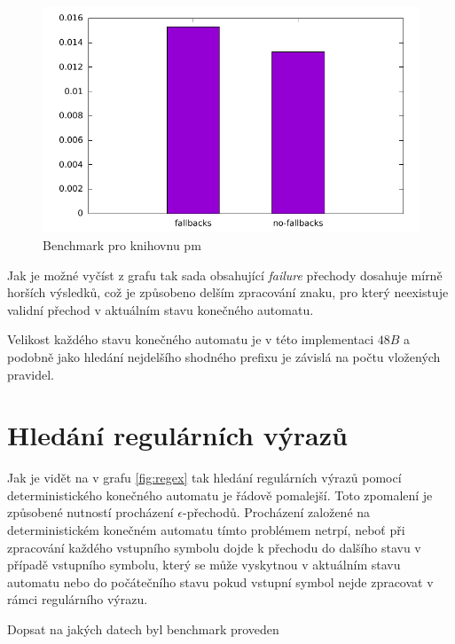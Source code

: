 \begin{figure}[!htbp]
	\centering
	\includegraphics[scale=0.7]{fig/pm.pdf}
	\caption{Benchmark pro knihovnu pm}
    \label{fig:pm}
\end{figure}

Jak je možné vyčíst z grafu tak sada obsahující \textit{failure} přechody dosahuje mírně horších výsledků,
což je způsobeno delším zpracování znaku, pro který neexistuje validní přechod v aktuálním stavu konečného automatu.

Velikost každého stavu konečného automatu je v této implementaci $48B$
a podobně jako hledání nejdelšího shodného prefixu je závislá na počtu vložených pravidel.

\section{Hledání regulárních výrazů} %

Jak je vidět na v grafu \ref{fig:regex} tak hledání regulárních výrazů pomocí deterministického
konečného automatu je řádově pomalejší. Toto zpomalení je způsobené nutností procházení $\epsilon$-přechodů.
Procházení založené na deterministickém konečném automatu tímto problémem netrpí,
neboť při zpracování každého vstupního symbolu dojde k přechodu do dalšího stavu v případě
vstupního symbolu, který se může vyskytnou v aktuálním stavu automatu nebo do počátečního stavu
pokud vstupní symbol nejde zpracovat v rámci regulárního výrazu.

Dopsat na jakých datech byl benchmark proveden

